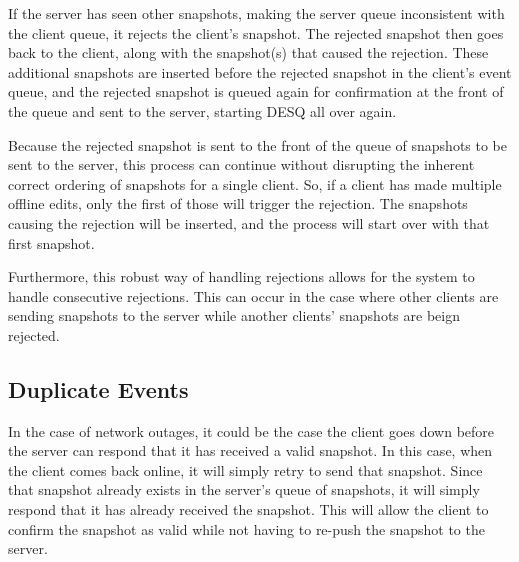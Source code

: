 If the server has seen other snapshots, making the server queue inconsistent with the client queue, it rejects the client's snapshot. The rejected snapshot then goes back to the client, along with the snapshot(s) that caused the rejection. These additional snapshots are inserted before the rejected snapshot in the client's event queue, and the rejected snapshot is queued again for confirmation at the front of the queue and sent to the server, starting DESQ all over again. 

Because the rejected snapshot is sent to the front of the queue of snapshots to be sent to the server, this process can continue without disrupting the inherent correct ordering of snapshots for a single client. So, if a client has made multiple offline edits, only the first of those will trigger the rejection. The snapshots causing the rejection will be inserted, and the process will start over with that first snapshot.

Furthermore, this robust way of handling rejections allows for the system to handle consecutive rejections. This can occur in the case where other clients are sending snapshots to the server while another clients' snapshots are beign rejected.

\subsection{Duplicate Events}

In the case of network outages, it could be the case the client goes down before the server can respond that it has received a valid snapshot. In this case, when the client comes back online, it will simply retry to send that snapshot. Since that snapshot already exists in the server’s queue of snapshots, it will simply respond that it has already received the snapshot. This will allow the client to confirm the snapshot as valid while not having to re-push the snapshot to the server.


